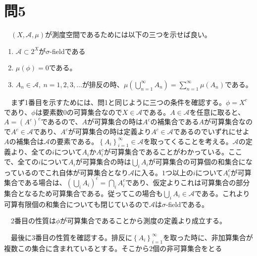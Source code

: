 \documentclass{article}
\begin{document}
\section{問5}
　$\left( X, \mathcal{A}, \mu \right)$が測度空間であるためには以下の三つを示せば良い。
\begin{enumerate}
	\item $\mathcal{A} \subset 2^X$が$\sigma$-fieldである
	\item $\mu(\phi) = 0$である。
	\item $A_n \in \mathcal{A},\ n = 1,2,3,\dots$が排反の時、$\mu\left( \bigcup_{n = 1}^{\infty} A_n \right) = \sum_{n = 1}^{\infty} \mu\left( A_n \right)$である。
\end{enumerate}

　まず1番目を示すためには、問1と同じように三つの条件を確認する。$\phi = X^c$であり、$\phi$は要素数$0$の可算集合なので$X \in \mathcal{A}$である。$A \in \mathcal{A}$を任意に取ると、$A = (A^c)^c$であるので、$A$が可算集合の時は$A^c$の補集合である$A$が可算集合なので$A^c \in \mathcal{A}$であり、$A^c$が可算集合の時は定義より$A^c \in \mathcal{A}$であるのでいずれにせよ$A$の補集合は$\mathcal{A}$の要素である。$\left\{ A_i \right\}_{i = 1}^{\infty} \in \mathcal{A}$を取ってくることを考える。$\mathcal{A}$の定義より、全ての$i$について$A_i$か$A_i^c$が可算集合であることがわかっている。ここで、全ての$i$について$A_i$が可算集合の時は$\bigcup_i A_i$が可算集合の可算個の和集合になっているのでこれ自体が可算集合となり$\mathcal{A}$に入る。$1$つ以上の$i$について$A_i^c$が可算集合である場合は、$\left( \bigcup_i A_i\right)^c = \bigcap_i A_i^c$であり、仮定よりこれは可算集合の部分集合となるため可算集合である。従ってこの場合も$ \bigcup_i A_i \in \mathcal{A}$である。これより可算有限個の和集合についても閉じているので$\mathcal{A}$は$\sigma$-fieldである。

　2番目の性質は$\phi$が可算集合であることから測度の定義より成立する。

　最後に3番目の性質を確認する。排反に$\left\{ A_i \right\}_{i = 1}^{\infty}$を取った時に、非加算集合が複数この集合に含まれているとする。そこから$2$個の非可算集合をとる
\end{document}
